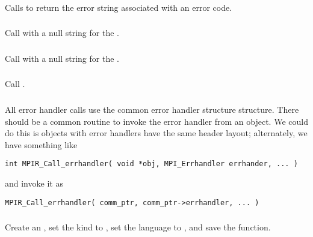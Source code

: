 \documentclass{article}
\begin{document}

\subsubsection{}
Calls  to return the error string
associated with an error code. 

\subsubsection{}
Call  with a null string for the
. 

\subsubsection{}
Call  with a null string for the
. 

\subsubsection{}
Call .

\subsubsection{}
All error handler calls use the common error handler structure
 structure.  There should be a common
routine to invoke the error handler from an object.  We could do this
is objects with error handlers have the same header layout;
alternately, we have something like
\begin{verbatim}
int MPIR_Call_errhandler( void *obj, MPI_Errhandler errhander, ... )
\end{verbatim}
and invoke it as
\begin{verbatim}
MPIR_Call_errhandler( comm_ptr, comm_ptr->errhandler, ... )
\end{verbatim}

\subsubsection{}
Create an , set the kind to
, set the language to , and
save the function.  
\end{document}
